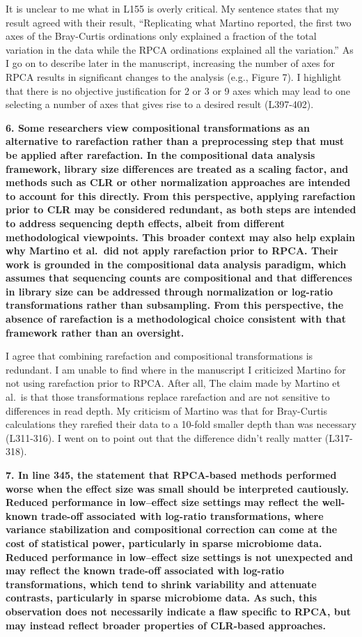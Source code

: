 \documentclass[
  11pt,
]{article}
\begin{document}
It is unclear to me what in L155 is overly critical. My sentence states
that my result agreed with their result, ``Replicating what Martino
reported, the first two axes of the Bray-Curtis ordinations only
explained a fraction of the total variation in the data while the RPCA
ordinations explained all the variation.'' As I go on to describe later
in the manuscript, increasing the number of axes for RPCA results in
significant changes to the analysis (e.g., Figure 7). I highlight that
there is no objective justification for 2 or 3 or 9 axes which may lead
to one selecting a number of axes that gives rise to a desired result
(L397-402).

\textbf{6. Some researchers view compositional transformations as an
alternative to rarefaction rather than a preprocessing step that must be
applied after rarefaction. In the compositional data analysis framework,
library size differences are treated as a scaling factor, and methods
such as CLR or other normalization approaches are intended to account
for this directly. From this perspective, applying rarefaction prior to
CLR may be considered redundant, as both steps are intended to address
sequencing depth effects, albeit from different methodological
viewpoints. This broader context may also help explain why Martino et
al.~did not apply rarefaction prior to RPCA. Their work is grounded in
the compositional data analysis paradigm, which assumes that sequencing
counts are compositional and that differences in library size can be
addressed through normalization or log-ratio transformations rather than
subsampling. From this perspective, the absence of rarefaction is a
methodological choice consistent with that framework rather than an
oversight.}

I agree that combining rarefaction and compositional transformations is
redundant. I am unable to find where in the manuscript I criticized
Martino for not using rarefaction prior to RPCA. After all, The claim
made by Martino et al.~is that those transformations replace rarefaction
and are not sensitive to differences in read depth. My criticism of
Martino was that for Bray-Curtis calculations they rarefied their data
to a 10-fold smaller depth than was necessary (L311-316). I went on to
point out that the difference didn't really matter (L317-318).

\textbf{7. In line 345, the statement that RPCA-based methods performed
worse when the effect size was small should be interpreted cautiously.
Reduced performance in low--effect size settings may reflect the
well-known trade-off associated with log-ratio transformations, where
variance stabilization and compositional correction can come at the cost
of statistical power, particularly in sparse microbiome data. Reduced
performance in low--effect size settings is not unexpected and may
reflect the known trade-off associated with log-ratio transformations,
which tend to shrink variability and attenuate contrasts, particularly
in sparse microbiome data. As such, this observation does not
necessarily indicate a flaw specific to RPCA, but may instead reflect
broader properties of CLR-based approaches.}
\end{document}
